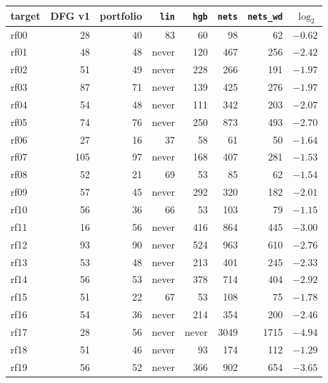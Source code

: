 \begin{tabular}{lrrrrrrr}
\toprule
target & DFG v1 & portfolio & \texttt{lin} & \texttt{hgb} & \texttt{nets} & \texttt{nets\_wd} & $\log_2$\\
\midrule
rf00 & 28 & 40 & 83 & 60 & 98 & 62 & $-0.62$\\
rf01 & 48 & 48 & never & 120 & 467 & 256 & $-2.42$\\
rf02 & 51 & 49 & never & 228 & 266 & 191 & $-1.97$\\
rf03 & 87 & 71 & never & 139 & 425 & 276 & $-1.97$\\
rf04 & 54 & 48 & never & 111 & 342 & 203 & $-2.07$\\
rf05 & 74 & 76 & never & 250 & 873 & 493 & $-2.70$\\
rf06 & 27 & 16 & 37 & 58 & 61 & 50 & $-1.64$\\
rf07 & 105 & 97 & never & 168 & 407 & 281 & $-1.53$\\
rf08 & 52 & 21 & 69 & 53 & 85 & 62 & $-1.54$\\
rf09 & 57 & 45 & never & 292 & 320 & 182 & $-2.01$\\
rf10 & 56 & 36 & 66 & 53 & 103 & 79 & $-1.15$\\
rf11 & 16 & 56 & never & 416 & 864 & 445 & $-3.00$\\
rf12 & 93 & 90 & never & 524 & 963 & 610 & $-2.76$\\
rf13 & 53 & 48 & never & 213 & 401 & 245 & $-2.33$\\
rf14 & 56 & 53 & never & 378 & 714 & 404 & $-2.92$\\
rf15 & 51 & 22 & 67 & 53 & 108 & 75 & $-1.78$\\
rf16 & 54 & 36 & never & 214 & 354 & 200 & $-2.46$\\
rf17 & 28 & 56 & never & never & 3049 & 1715 & $-4.94$\\
rf18 & 51 & 46 & never & 93 & 174 & 112 & $-1.29$\\
rf19 & 56 & 52 & never & 366 & 902 & 654 & $-3.65$\\
\bottomrule
\end{tabular}
